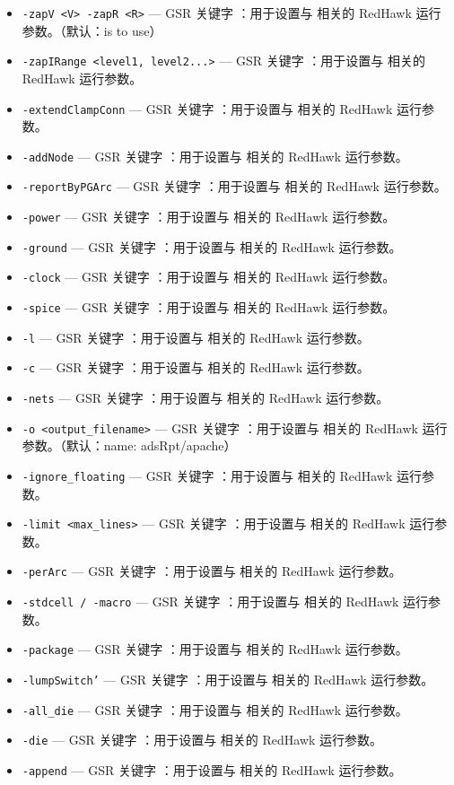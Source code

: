 \begin{itemize}
\item \texttt{-zapV <V> -zapR <R>} — GSR 关键字 ：用于设置与  相关的 RedHawk 运行参数。（默认：is to use）
\item \texttt{-zapIRange <level1, level2...>} — GSR 关键字 ：用于设置与  相关的 RedHawk 运行参数。
\item \texttt{-extendClampConn} — GSR 关键字 ：用于设置与  相关的 RedHawk 运行参数。
\item \texttt{-addNode} — GSR 关键字 ：用于设置与  相关的 RedHawk 运行参数。
\item \texttt{-reportByPGArc} — GSR 关键字 ：用于设置与  相关的 RedHawk 运行参数。
\item \texttt{-power} — GSR 关键字 ：用于设置与  相关的 RedHawk 运行参数。
\item \texttt{-ground} — GSR 关键字 ：用于设置与  相关的 RedHawk 运行参数。
\item \texttt{-clock} — GSR 关键字 ：用于设置与  相关的 RedHawk 运行参数。
\item \texttt{-spice} — GSR 关键字 ：用于设置与  相关的 RedHawk 运行参数。
\item \texttt{-l} — GSR 关键字 ：用于设置与  相关的 RedHawk 运行参数。
\item \texttt{-c} — GSR 关键字 ：用于设置与  相关的 RedHawk 运行参数。
\item \texttt{-nets} — GSR 关键字 ：用于设置与  相关的 RedHawk 运行参数。
\item \texttt{-o <output\_filename>} — GSR 关键字 ：用于设置与  相关的 RedHawk 运行参数。（默认：name: adsRpt/apache）
\item \texttt{-ignore\_floating} — GSR 关键字 ：用于设置与  相关的 RedHawk 运行参数。
\item \texttt{-limit <max\_lines>} — GSR 关键字 ：用于设置与  相关的 RedHawk 运行参数。
\item \texttt{-perArc} — GSR 关键字 ：用于设置与  相关的 RedHawk 运行参数。
\item \texttt{-stdcell / -macro} — GSR 关键字 ：用于设置与  相关的 RedHawk 运行参数。
\item \texttt{-package} — GSR 关键字 ：用于设置与  相关的 RedHawk 运行参数。
\item \texttt{-lumpSwitch'} — GSR 关键字 ：用于设置与  相关的 RedHawk 运行参数。
\item \texttt{-all\_die} — GSR 关键字 ：用于设置与  相关的 RedHawk 运行参数。
\item \texttt{-die} — GSR 关键字 ：用于设置与  相关的 RedHawk 运行参数。
\item \texttt{-append} — GSR 关键字 ：用于设置与  相关的 RedHawk 运行参数。

\end{itemize}
